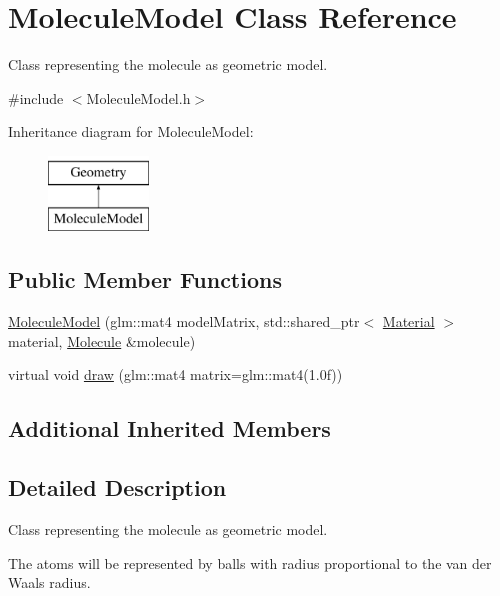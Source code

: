 \hypertarget{class_molecule_model}{}\section{Molecule\+Model Class Reference}
\label{class_molecule_model}


Class representing the molecule as geometric model.  




{\ttfamily \#include $<$Molecule\+Model.\+h$>$}

Inheritance diagram for Molecule\+Model\+:\begin{figure}[H]
\begin{center}
\leavevmode
\includegraphics[height=2.000000cm]{class_molecule_model}
\end{center}
\end{figure}
\subsection*{Public Member Functions}
\begin{DoxyCompactItemize}
\item 
\mbox{\hyperlink{class_molecule_model_aebdf0cf8057e91460a55a73b660ef880}{Molecule\+Model}} (glm\+::mat4 model\+Matrix, std\+::shared\+\_\+ptr$<$ \mbox{\hyperlink{class_material}{Material}} $>$ material, \mbox{\hyperlink{struct_molecule}{Molecule}} \&molecule)
\item 
virtual void \mbox{\hyperlink{class_molecule_model_a3f33fde639e7778b811467a81e917d15}{draw}} (glm\+::mat4 matrix=glm\+::mat4(1.\+0f))
\end{DoxyCompactItemize}
\subsection*{Additional Inherited Members}


\subsection{Detailed Description}
Class representing the molecule as geometric model. 

The atoms will be represented by balls with radius proportional to the van der Waals radius. 

